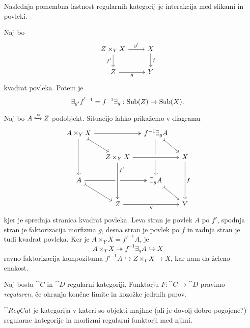 \documentclass[../kategoricna_logika.tex]{subfiles}
\begin{document}
Naslednja pomembna lastnost regularnih kategorij je interakcija med
slikami in povleki.
\begin{lema}\label{lema:zamenjava-povleka-in-slike}
  Naj bo
  \begin{equation*}
    \begin{tikzcd}
      Z \times_Y X \ar[d, "f'"'] \ar[r, "g'"] & X \ar[d, "f"] \\
      Z \ar[r, "g"'] & Y
    \end{tikzcd}
  \end{equation*}
  kvadrat povleka. Potem je
  $$\exists_{g'}f^{'-1} = f^{-1}\exists_g : \operatorname{Sub}(Z) \to \operatorname{Sub}(X).$$
\end{lema}
\begin{dokaz}
  Naj bo $A \xhookrightarrow{\alpha} Z$ podobjekt.  Situacijo lahko
  prikažemo v diagramu
  \begin{equation*}
    \begin{tikzcd}[column sep=small]
      A \times_Y X \ar[dd] \ar[dr, tail] \ar[rr, two heads] & &
      f^{-1}\exists_g A \ar[dd] \ar[dr, tail] & \\
      & Z \times_Y X  \ar[rr, crossing over] & & X \ar[dd, "f"] \\
      A \ar[dr, tail] \ar[rr, two heads] & & \exists_g A \ar[dr, tail] & \\
      & Z \ar[rr, "g"'] \ar[from=uu, pos=0.2, crossing over, "f'"] & &
      Y
    \end{tikzcd}
  \end{equation*}
  kjer je sprednja stranica kvadrat povleka.  Leva stran je povlek $A$
  po $f'$, spodnja stran je faktorizacija morfizma $g$, desna stran je
  povlek po $f$ in zadnja stran je tudi kvadrat povleka.  Ker je
  $A \times_Y X = f'^{-1}A$, je
  \[A \times_Y X \twoheadrightarrow f^{-1}\exists_g A \hookrightarrow
    X\] ravno faktorizacija kompozituma
  $f'^{-1}A \hookrightarrow Z \times_Y X \to X$, kar nam da želeno
  enakost.
\end{dokaz}
\begin{definicija}
  Naj bosta $\cat{C}$ in $\cat{D}$ regularni kategoriji.  Funktorju
  ${F : \cat{C} \to \cat{D}}$ pravimo \emph{regularen}, če ohranja
  končne limite in kozožke jedrnih parov.
\end{definicija}
\begin{definicija}
  $\cat{RegCat}$ je kategorija v kateri so objekti majhne (ali je
  dovolj dobro pogojene?) regularne kategorije in morfizmi regularni
  funktorji med njimi.
\end{definicija}
\end{document}
